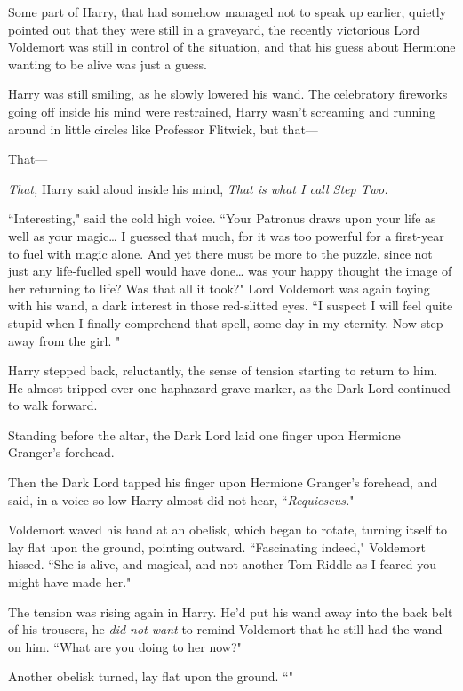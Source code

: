 Some part of Harry, that had somehow managed not to speak up earlier, quietly pointed out that they were still in a graveyard, the recently victorious Lord Voldemort was still in control of the situation, and that his guess about Hermione wanting to be alive was just a guess.

Harry was still smiling, as he slowly lowered his wand. The celebratory fireworks going off inside his mind were restrained, Harry wasn't screaming and running around in little circles like Professor Flitwick, but that—

That—

\emph{\emph{That,}} Harry said aloud inside his mind, \emph{\emph{That} is what I call Step Two.}

``Interesting," said the cold high voice. ``Your Patronus draws upon your life as well as your magic{\ldots} I guessed that much, for it was too powerful for a first-year to fuel with magic alone. And yet there must be more to the puzzle, since not just any life-fuelled spell would have done{\ldots} was your happy thought the image of her returning to life? Was that all it took?" Lord Voldemort was again toying with his wand, a dark interest in those red-slitted eyes. ``I suspect I will feel quite stupid when I finally comprehend that spell, some day in my eternity. Now step away from the girl. "

Harry stepped back, reluctantly, the sense of tension starting to return to him. He almost tripped over one haphazard grave marker, as the Dark Lord continued to walk forward.

Standing before the altar, the Dark Lord laid one finger upon Hermione Granger's forehead.

Then the Dark Lord tapped his finger upon Hermione Granger's forehead, and said, in a voice so low Harry almost did not hear, ``\emph{Requiescus.}"

Voldemort waved his hand at an obelisk, which began to rotate, turning itself to lay flat upon the ground, pointing outward. ``Fascinating indeed," Voldemort hissed. ``She is alive, and magical, and not another Tom Riddle as I feared you might have made her."

The tension was rising again in Harry. He'd put his wand away into the back belt of his trousers, he \emph{did not want} to remind Voldemort that he still had the wand on him. ``What are you doing to her now?"

Another obelisk turned, lay flat upon the ground. ``"

